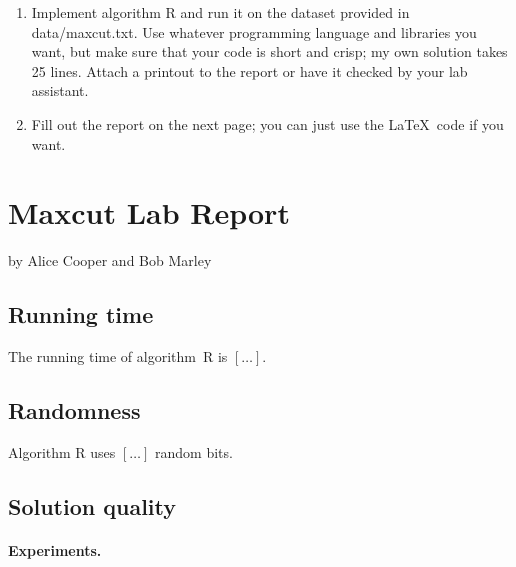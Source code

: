 \documentclass{tufte-handout}
\begin{document}
\begin{enumerate}
\item Implement algorithm R and run it on the dataset provided in
  data/maxcut.txt.
  Use whatever programming language and libraries you want, but make
  sure that your code is short and crisp; my own solution takes 25
  lines.
  Attach a printout to the report or have it checked by your lab
  assistant.
\item Fill out the report on the next page; you can just use the
  \LaTeX\ code if you want.
\end{enumerate}

\newpage


\newpage
\section{Maxcut Lab Report}


by Alice Cooper and Bob Marley

\subsection{Running time}

The running time of algorithm~R is $[\ldots]$.

\subsection{Randomness}

Algorithm R uses $[\ldots]$ random bits.

\subsection{Solution quality}

\paragraph{Experiments.}
\end{document}
